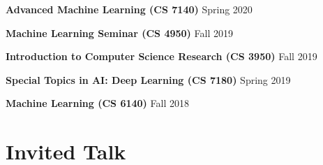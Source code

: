 \documentclass[margin,line]{res}
\begin{document}
\begin{resume}
 {\bf Advanced Machine Learning  (CS 7140)}   \hfill  { Spring 2020} 


 {\bf Machine Learning Seminar (CS 4950)}   \hfill  { Fall 2019} 

 {\bf Introduction to Computer Science Research (CS 3950)}   \hfill  { Fall 2019} 
 
 {\bf Special Topics in AI: Deep Learning (CS 7180)}   \hfill  { Spring 2019} 


 {\bf Machine Learning (CS 6140)}   \hfill  { Fall 2018 } 


% 
 
% 
% 








\section{\sc Invited Talk}


\end{resume}
\end{document}
